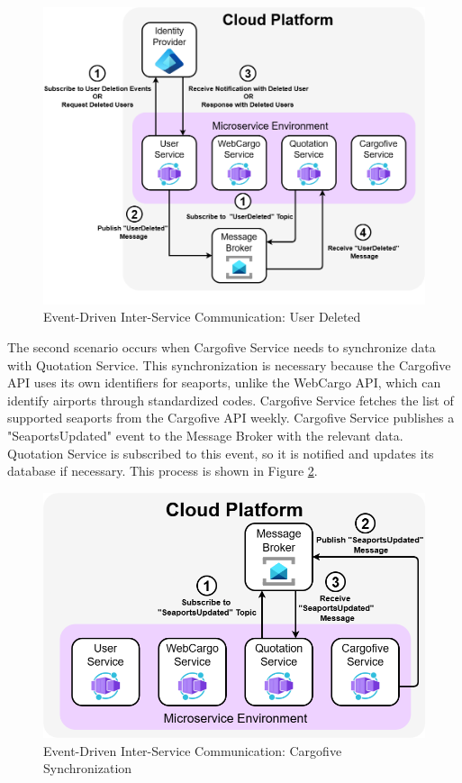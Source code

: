 \documentclass[12pt, reqno]{amsbook}
\theoremstyle{definition}
\theoremstyle{definition}
\numberwithin{section}{chapter}
\numberwithin{table}{chapter}
\numberwithin{figure}{chapter}
\begin{document}
\begin{figure}[H]
  \centering
  \includegraphics[width=0.9\linewidth]{images/EventDrivenCommunicationUserDeleted.png}
  \caption{\label{Figure:EventDrivenCommunicationUserDeleted}Event-Driven Inter-Service Communication: User Deleted}
\end{figure}

The second scenario occurs when Cargofive Service needs to synchronize data with Quotation Service. This synchronization is necessary because the Cargofive \Ac{API} uses its own identifiers for seaports, unlike the WebCargo \ac{API}, which can identify airports through standardized codes. Cargofive Service fetches the list of supported seaports from the Cargofive \ac{API} weekly. Cargofive Service publishes a "SeaportsUpdated" event to the Message Broker with the relevant data. Quotation Service is subscribed to this event, so it is notified and updates its database if necessary. This process is shown in Figure \ref{Figure:EventDrivenCommunicationCargofive}.

\begin{figure}[H]
  \centering
  \includegraphics[width=0.8\linewidth]{images/EventDrivenCommunicationCargofive.png}
  \caption{\label{Figure:EventDrivenCommunicationCargofive}Event-Driven Inter-Service Communication: Cargofive Synchronization}
\end{figure}
\end{document}
